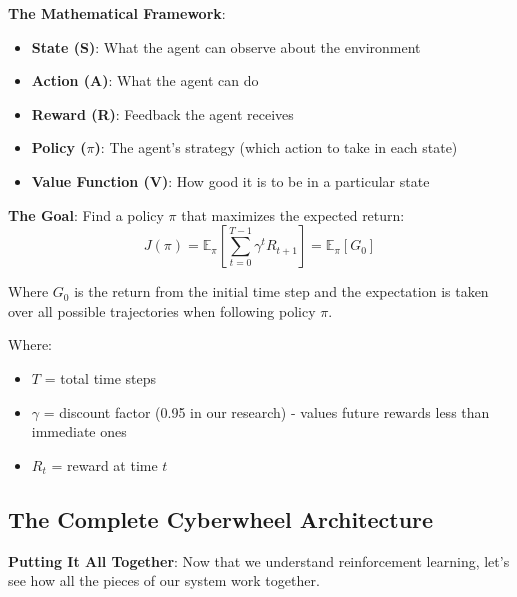 \documentclass[11pt]{article}
\begin{document}
\begin{mathdetails}
\textbf{The Mathematical Framework}:
\begin{itemize}
\item \textbf{State (S)}: What the agent can observe about the environment
\item \textbf{Action (A)}: What the agent can do
\item \textbf{Reward (R)}: Feedback the agent receives
\item \textbf{Policy ($\pi$)}: The agent's strategy (which action to take in each state)
\item \textbf{Value Function (V)}: How good it is to be in a particular state
\end{itemize}

\textbf{The Goal}: Find a policy $\pi$ that maximizes the expected return:
$$J(\pi) = \mathbb{E}_\pi\left[\sum_{t=0}^{T-1} \gamma^t R_{t+1}\right] = \mathbb{E}_\pi[G_0]$$

Where $G_0$ is the return from the initial time step and the expectation is taken over all possible trajectories when following policy $\pi$.

Where:
\begin{itemize}
\item $T$ = total time steps
\item $\gamma$ = discount factor (0.95 in our research) - values future rewards less than immediate ones
\item $R_t$ = reward at time $t$
\end{itemize}
\end{mathdetails}

\subsection{The Complete Cyberwheel Architecture}

\begin{foundation}
\textbf{Putting It All Together}: Now that we understand reinforcement learning, let's see how all the pieces of our system work together.
\end{foundation}

\end{document}
